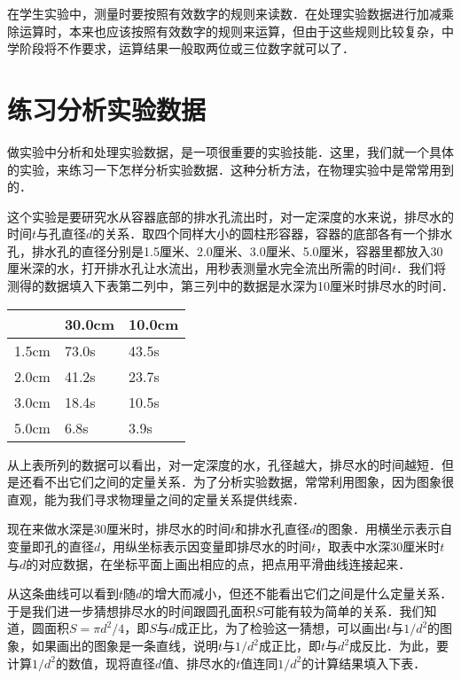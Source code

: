 在学生实验中，测量时要按照有效数字的规则来读数．在处理实验数据进行加减乘除运算时，本来也应该按照有效数字的规则来运算，但由于这些规则比较复杂，中学阶段将不作要求，运算结果一般取两位或三位数字就可以了．

\section{练习分析实验数据}
做实验中分析和处理实验数据，是一项很重要的实验技能．这里，我们就一个具体的实验，来练习一下怎样分析实验数据．这种分析方法，在物理实验中是常常用到的．

这个实验是要研究水从容器底部的排水孔流出时，对一定深度的水来说，排尽水的时间$t$与孔直径$d$的关系．取四个同样大小的圆柱形容器，容器的底部各有一个排水孔，排水孔的直径分别是1.5厘米、2.0厘米、3.0厘米、5.0厘米，容器里都放入30厘米深的水，打开排水孔让水流出，用秒表测量水完全流出所需的时间$t$．我们将测得的数据填入下表第二列中，第三列中的数据是水深为10厘米时排尽水的时间．
\begin{table}[H]
    \centering
    \begin{tabularx}{\textwidth}{MMM}
        \toprule[1.5pt]
              & 30.0cm & 10.0cm \\
        \midrule
        1.5cm & 73.0s  & 43.5s  \\
        2.0cm & 41.2s  & 23.7s  \\
        3.0cm & 18.4s  & 10.5s  \\
        5.0cm & 6.8s   & 3.9s   \\
        \bottomrule[1.5pt]
    \end{tabularx}
\end{table}

从上表所列的数据可以看出，对一定深度的水，孔径越大，排尽水的时间越短．但是还看不出它们之间的定量关系．为了分析实验数据，常常利用图象，因为图象很直观，能为我们寻求物理量之间的定量关系提供线索．

现在来做水深是30厘米时，排尽水的时间$t$和排水孔直径$d$的图象．用横坐示表示自变量即孔的直径$d$，用纵坐标表示因变量即排尽水的时间$t$，取表中水深30厘米时$t$与$d$的对应数据，在坐标平面上画出相应的点，把点用平滑曲线连接起来．

从这条曲线可以看到$t$随$d$的增大而减小，但还不能看出它们之间是什么定量关系．于是我们进一步猜想排尽水的时间跟圆孔面积$S$可能有较为简单的关系．我们知道，圆面积$S=\pi d^2/4$，即$S$与$d$成正比，为了检验这一猜想，可以画出$t$与$1/d^2$的图象，如果画出的图象是一条直线，说明$t$与$1/d^2$成正比，即$t$与$d^2$成反比．为此，要计算$1/d^2$的数值，现将直径$d$值、排尽水的$t$值连同$1/d^2$的计算结果填入下表．

